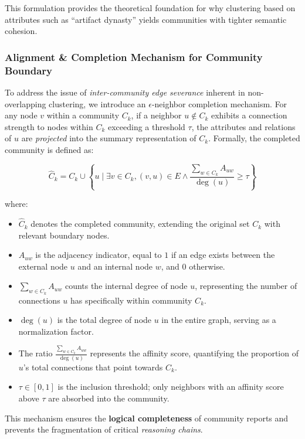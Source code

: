 \documentclass[11pt]{article}
\begin{document}
This formulation provides the theoretical foundation for why clustering based on attributes such as ``artifact dynasty'' yields communities with tighter semantic cohesion.

\subsubsection{Alignment \& Completion Mechanism for Community Boundary}
\label{sec:completion}

To address the issue of \textit{inter-community edge severance} inherent in non-overlapping clustering, we introduce an $\epsilon$-neighbor completion mechanism. For any node $v$ within a community $C_k$, if a neighbor $u \notin C_k$ exhibits a connection strength to nodes within $C_k$ exceeding a threshold $\tau$, the attributes and relations of $u$ are \textit{projected} into the summary representation of $C_k$. Formally, the completed community is defined as:
\begin{center}
\small
\begin{equation}
    \widehat{C}_k = C_k \cup \left\{ u \mid \exists v \in C_k, (v, u) \in E \land \frac{\sum_{w \in C_k} A_{uw}}{\deg(u)} \geq \tau \right\}
    \label{eq:boundary_completion}
\end{equation}
\normalsize
\end{center}
\noindent where:
\begin{itemize}
    \item $\widehat{C}_k$ denotes the completed community, extending the original set $C_k$ with relevant boundary nodes.
    \item $A_{uw}$ is the adjacency indicator, equal to $1$ if an edge exists between the external node $u$ and an internal node $w$, and $0$ otherwise.
    \item $\sum_{w \in C_k} A_{uw}$ counts the internal degree of node $u$, representing the number of connections $u$ has specifically within community $C_k$.
    \item $\deg(u)$ is the total degree of node $u$ in the entire graph, serving as a normalization factor.
    \item The ratio $\frac{\sum_{w \in C_k} A_{uw}}{\deg(u)}$ represents the affinity score, quantifying the proportion of $u$'s total connections that point towards $C_k$.
    \item $\tau \in [0, 1]$ is the inclusion threshold; only neighbors with an affinity score above $\tau$ are absorbed into the community.
\end{itemize}
\noindent This mechanism ensures the \textbf{logical completeness} of community reports and prevents the fragmentation of critical \textit{reasoning chains}.
\end{document}
